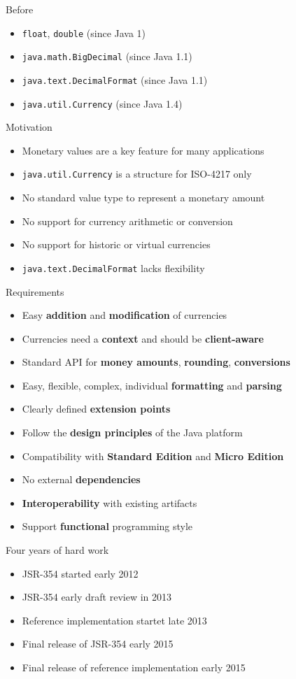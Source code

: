 \documentclass{beamer}
\newcommand{\code}[1]{\texttt{#1}}
\newcommand{\bb}[1]{\textbf{#1}}
\newcommand{\slideItems}[1]{
	\begin{itemize}
		#1
	\end{itemize}
}
\newcommand{\slide}[2]{
	\begin{frame}{#1}
		#2
	\end{frame}
}
\begin{document}
\slide{Before}{
	\slideItems{
		\item \code{float}, \code{double} (since Java 1)
		\item \code{java.math.BigDecimal} (since Java 1.1)
		\item \code{java.text.DecimalFormat} (since Java 1.1)
		\item \code{java.util.Currency} (since Java 1.4)
	}
}

\slide{Motivation}{
	\slideItems{
		\item Monetary values are a key feature for many applications
		\item \code{java.util.Currency} is a structure for ISO-4217 only
		\item No standard value type to represent a monetary amount
		\item No support for currency arithmetic or conversion
		\item No support for historic or virtual currencies
		\item \code{java.text.DecimalFormat} lacks flexibility
	}
}

\slide{Requirements}{
	\slideItems{
		\item Easy \bb{addition} and \bb{modification} of currencies
		\item Currencies need a \bb{context} and should be \bb{client-aware}
		\item Standard API for \bb{money amounts}, \bb{rounding}, \bb{conversions}
		\item Easy, flexible, complex, individual \bb{formatting} and \bb{parsing}
		\item Clearly defined \bb{extension points}
		\item Follow the \bb{design principles} of the Java platform
		\item Compatibility with \bb{Standard Edition} and \bb{Micro Edition}
		\item No external \bb{dependencies}
		\item \bb{Interoperability} with existing artifacts
		\item Support \bb{functional} programming style
	}
}

\slide{Four years of hard work}{
	\slideItems{
		\item JSR-354 started early 2012
		\item JSR-354 early draft review in 2013
		\item Reference implementation startet late 2013
		\item Final release of JSR-354 early 2015
		\item Final release of reference implementation early 2015
	}
}
\end{document}
